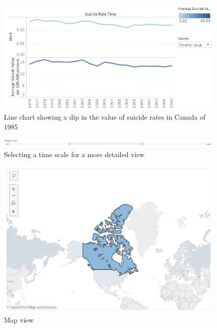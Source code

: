\documentclass{vgtc}                          %
\begin{document}
\begin{itemize}
\begin{figure}[tb]
\centering
\includegraphics[width=\columnwidth]{image/chris/researcher01.png}
\caption{Line chart showing a dip in the value of suicide rates in Canada of 1985}
\label{fig:resLine} 
\end{figure}

\begin{figure}[tb]
\centering
\includegraphics[width=\columnwidth]{image/chris/researcher02.png}
\caption{Selecting a time scale for a more detailed view}
\label{fig:resTime} 
\end{figure}

\begin{figure}[tb]
\centering
\includegraphics[width=\columnwidth]{image/chris/researcher03.png}
\caption{Map view}
\label{fig:resMap} 
\end{figure}


\end{itemize}
\end{document}
